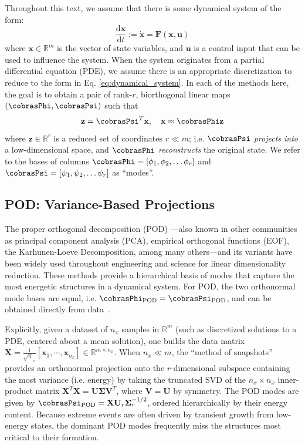 \documentclass[twocolumn,10pt]{article}
\begin{document}
Throughout this text, we assume that there is some dynamical system of the form:
%
\begin{equation} \label{eq:dynamical_system}
    \frac{\mathrm{d}{\mathbf x}}{\mathrm{d}t} := \dot{\mathbf{x}} = \mathbf F (\mathbf x, \mathbf u)
\end{equation}
%
where $\mathbf x \in \mathbb R^m$ is the vector of  state variables, and $\mathbf u$ is a control input that can be used to influence the system. When the system originates from a partial differential equation (PDE), we assume there is an appropriate discretization to reduce to the form in Eq. \ref{eq:dynamical_system}. In each of the methods here, the goal is to obtain a pair of rank-$r$, biorthogonal linear maps $(\cobrasPhi, \cobrasPsi)$  such that
%
\begin{align} \label{eq:projections}
    \mathbf z = \cobrasPsi^T \mathbf x, \quad
    \mathbf x \approx  \cobrasPhi \mathbf z
\end{align}
%
where $\mathbf z \in \mathbb R^r$ is a reduced set of coordinates $r \ll m$; i.e. $\cobrasPsi$  \textit{projects into} a low-dimensional space, and $\cobrasPhi$ \textit{reconstructs} the original state. We refer to the bases of columns
$\cobrasPhi = [\phi_1, \phi_2, \dots \phi_r]$ and 
$\cobrasPsi = [\psi_1, \psi_2, \dots \psi_r]$  as ``modes''.

\subsection{POD: Variance-Based Projections}
The proper orthogonal decomposition (POD) \cite{berkooz1993proper}---also known in other communities as principal component analysis (PCA), empirical orthogonal functions (EOF), the Karhunen-Loeve Decomposition, among many others---and its variants \cite{towne2018spectral, schmidt2019conditional, schmidt2026data} have been widely used throughout engineering and science for linear dimensionality reduction. These methods provide a hierarchical basis of modes that capture the most energetic structures in a dynamical system.  For POD, the two orthonormal mode bases are equal, i.e. $\cobrasPhi_{\text{POD}} = \cobrasPsi_{\text{POD}}$, and can be obtained directly from data~\cite{Brunton2022book}. 

%
Explicitly, given a dataset of $n_x$ samples in $\mathbb R^m$ (such as discretized solutions to a PDE, centered about a mean solution), one builds the data matrix ${\mathbf X = \frac{1}{\sqrt n_x}[\mathbf x_1, \cdots, \mathbf x_{n_x}] \in \mathbb{R}^{m \times n_x}}$. 
%
When $n_x \ll m$, the ``method of snapshots'' ~\cite{Sirovich:1987} provides an orthonormal projection onto the $r$-dimensional subspace containing the most variance (i.e. energy) by taking the truncated SVD of the $n_x \times n_x$ inner-product matrix $\mathbf X^T \mathbf X = \mathbf U \mathbf \Sigma \mathbf V^T$, where $\mathbf V = \mathbf U$ by symmetry.
%
The POD modes are given by $\cobrasPsi_{\text{POD}} = \mathbf X \mathbf U_r \mathbf \Sigma_r^{-1/2}$,  ordered hierarchically by their energy content. 
Because extreme events are often driven by transient growth from low-energy states, the dominant POD modes frequently miss the structures most critical to their formation.
\end{document}
